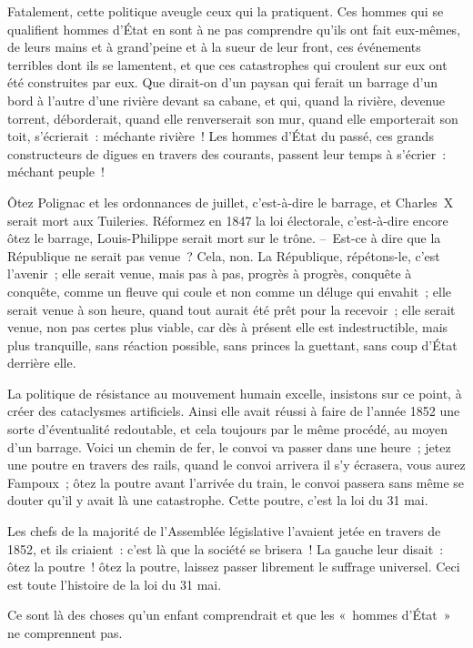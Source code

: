 \documentclass[french,twoside]{book} %
\begin{document}
Fatalement, cette politique aveugle ceux qui la pratiquent. Ces hommes qui se qualifient hommes d’État en sont à ne pas comprendre qu’ils ont fait eux-mêmes, de leurs mains et à grand’peine et à la sueur de leur front, ces événements terribles dont ils se lamentent, et que ces catastrophes qui croulent sur eux ont été construites par eux. Que dirait-on d’un paysan qui ferait un barrage d’un bord à l’autre d’une rivière devant sa cabane, et qui, quand la rivière, devenue torrent, déborderait, quand elle renverserait son mur, quand elle emporterait son toit, s’écrierait : méchante rivière ! Les hommes d’État du passé, ces grands constructeurs de digues en travers des courants, passent leur temps à s’écrier : méchant peuple !\par
Ôtez Polignac et les ordonnances de juillet, c’est-à-dire le barrage, et Charles X serait mort aux Tuileries. Réformez en 1847 la loi électorale, c’est-à-dire encore ôtez le barrage, Louis-Philippe serait mort sur le trône. – Est-ce à dire que la République ne serait pas venue ? Cela, non. La République, répétons-le, c’est l’avenir ; elle serait venue, mais pas à pas, progrès à progrès, conquête à conquête, comme un fleuve qui coule et non comme un déluge qui envahit ; elle serait venue à son heure, quand tout aurait été prêt pour la recevoir ; elle serait venue, non pas certes plus viable, car dès à présent elle est indestructible, mais plus tranquille, sans réaction possible, sans princes la guettant, sans coup d’État derrière elle.\par
La politique de résistance au mouvement humain excelle, insistons sur ce point, à créer des cataclysmes artificiels. Ainsi elle avait réussi à faire de l’année 1852 une sorte d’éventualité redoutable, et cela toujours par le même procédé, au moyen d’un barrage. Voici un chemin de fer, le convoi va passer dans une heure ; jetez une poutre en travers des rails, quand le convoi arrivera il s’y écrasera, vous aurez Fampoux ; ôtez la poutre avant l’arrivée du train, le convoi passera sans même se douter qu’il y avait là une catastrophe. Cette poutre, c’est la loi du 31 mai.\par
Les chefs de la majorité de l’Assemblée législative l’avaient jetée en travers de 1852, et ils criaient : c’est là que la société se brisera ! La gauche leur disait : ôtez la poutre ! ôtez la poutre, laissez passer librement le suffrage universel. Ceci est toute l’histoire de la loi du 31 mai.\par
Ce sont là des choses qu’un enfant comprendrait et que les « hommes d’État » ne comprennent pas.\par
\end{document}
